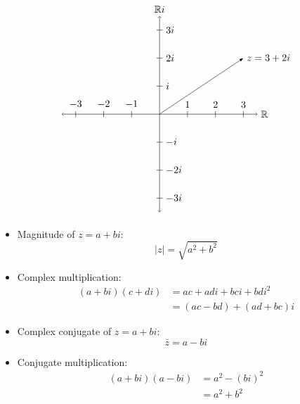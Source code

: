\documentclass{beamer}
\newcommand{\R}{\mathbb{R}}
\begin{document}
\frame
{

$$
\begin{tikzpicture}
\draw [<->] (-3.5,0) -- (3.5,0) node [right] {$\R$};
\draw [<->] (0,-3.5) -- (0,3.5) node [above] {$\R i$};

\foreach \n in {-3,...,-1,1,2,...,3} {
\draw (\n,-3pt) -- (\n,3pt)   node [above] {$\n$};
}

\foreach \n in {-3,-2,2,3} {  
\draw (-3pt,\n) -- (3pt,\n)   node [right] {$\n i$};
}

\draw (-3pt, -1) -- (3pt, -1)   node [right] {$-i$};
\draw (-3pt, 1) -- (3pt, 1)   node [right] {$i$};

\draw[-latex] (0,0)--(3,2) node[right, black]{$z = 3 + 2i$};

\end{tikzpicture}
$$

}

\frame
{
\begin{itemize}
\item <1->Magnitude of $z = a + bi$:
$$
|z| = \sqrt{a^2 + b^2}
$$
\item<2->Complex multiplication:
\begin{align*}
(a + bi)(c + di)	&= ac + adi + bci + bdi^2\\
		      	&= (ac - bd) + (ad + bc)i
\end{align*}
\item<3-> Complex conjugate of $z = a + bi$:
$$
\bar{z} = a - bi
$$
\item <4->Conjugate multiplication:
\begin{align*}
(a + bi)(a - bi)	&= a^2 - (bi)^2\\
			&= a^2 + b^2
\end{align*}
\end{itemize}
}
\end{document}
